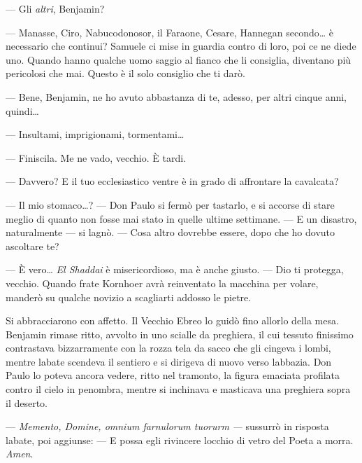 --- Gli \emph{altri}, Benjamin?

--- Manasse, Ciro, Nabucodonosor, il Faraone, Cesare, Hannegan
secondo\ldots{} è necessario che continui? Samuele ci mise in guardia
contro di loro, poi ce ne diede uno. Quando hanno qualche uomo saggio al
fianco che li consiglia, diventano più pericolosi che mai. Questo è il
solo consiglio che ti darò.

--- Bene, Benjamin, ne ho avuto abbastanza di te, adesso, per altri
cinque anni, quindi\ldots{}

--- Insultami, imprigionami, tormentami\ldots{}

--- Finiscila. Me ne vado, vecchio. È tardi.

--- Davvero? E il tuo ecclesiastico ventre è in grado di affrontare la
cavalcata?

--- Il mio stomaco\ldots? --- Don Paulo si fermò per tastarlo, e si
accorse di stare meglio di quanto non fosse mai stato in quelle ultime
settimane. --- E un disastro, naturalmente --- si lagnò. --- Cosa altro
dovrebbe essere, dopo che ho dovuto ascoltare te?

--- È vero\ldots{} \emph{El Shaddai} è misericordioso, ma è anche
giusto. --- Dio ti protegga, vecchio. Quando frate Kornhoer avrà
reinventato la macchina per volare, manderò su qualche novizio a
scagliarti addosso le pietre.

Si abbracciarono con affetto. Il Vecchio Ebreo lo guidò fino
all\textquotesingle orlo della mesa. Benjamin rimase ritto, avvolto in
uno scialle da preghiera, il cui tessuto finissimo contrastava
bizzarramente con la rozza tela da sacco che gli cingeva i lombi, mentre
l\textquotesingle abate scendeva il sentiero e si dirigeva di nuovo
verso l\textquotesingle abbazia. Don Paulo lo poteva ancora vedere,
ritto nel tramonto, la figura emaciata profilata contro il cielo in
penombra, mentre si inchinava e masticava una preghiera sopra il
deserto.

--- \emph{Memento, Domine, omnium farnulorum tuorurm} \emph{---}
sussurrò in risposta l\textquotesingle abate, poi aggiunse: --- E possa
egli rivincere l\textquotesingle occhio di vetro del Poeta a morra.
\emph{Amen}.
